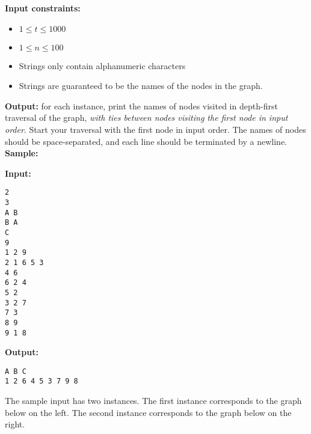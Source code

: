 \documentclass[solutionorbox,answers]{exam}
\begin{document}
\begin{questions}
\textbf{Input constraints:}
\begin{itemize}
    \item $1 \leq t \leq 1000$
    \item $1 \leq n \leq 100$
    \item Strings only contain alphanumeric characters
    \item Strings are guaranteed to be the names of the nodes in the graph.
\end{itemize}

\textbf{Output:} for each instance, print the names of nodes visited in depth-first traversal of the graph, \emph{with ties between nodes visiting the first node in input order}. Start your traversal with the first node in input order. The names of nodes should be space-separated, and each line should be terminated by a newline.\\

\textbf{Sample:}
\begin{multicols}{2}
\textbf{Input:} 
\begin{verbatim}
2
3
A B
B A
C
9
1 2 9
2 1 6 5 3
4 6
6 2 4
5 2
3 2 7
7 3
8 9
9 1 8
\end{verbatim}
\columnbreak
\textbf{Output:} 
\begin{verbatim}
A B C
1 2 6 4 5 3 7 9 8
\end{verbatim}
\end{multicols}

The sample input has two instances. 
The first instance corresponds to the graph below on the left. 
The second instance corresponds to the graph below on the right.
\begin{center}
\begin{minipage}{0.3\linewidth}
\end{minipage}
\qquad\qquad
\begin{minipage}{0.3\linewidth}
\end{minipage}

\hfill
\end{center}

\end{questions}
\end{document}
